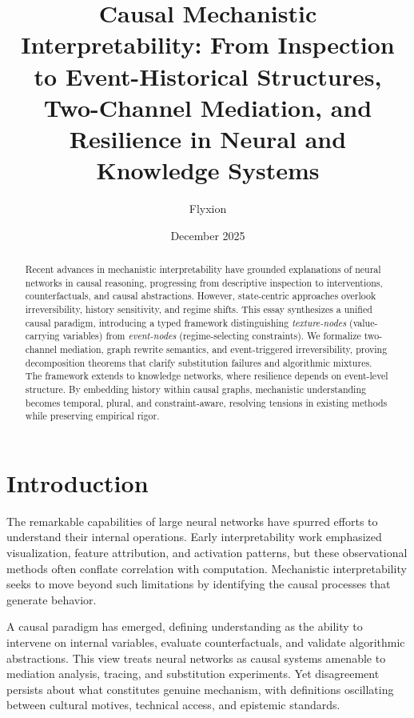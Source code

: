 \documentclass[11pt]{article}
\title{Causal Mechanistic Interpretability: From Inspection to Event-Historical Structures, Two-Channel Mediation, and Resilience in Neural and Knowledge Systems}
\author{Flyxion}
\date{December 2025}
\theoremstyle{remark}
\begin{document}
\maketitle

\begin{abstract}

Recent advances in mechanistic interpretability have grounded explanations of neural networks in causal reasoning, progressing from descriptive inspection to interventions, counterfactuals, and causal abstractions. However, state-centric approaches overlook irreversibility, history sensitivity, and regime shifts. This essay synthesizes a unified causal paradigm, introducing a typed framework distinguishing \emph{texture-nodes} (value-carrying variables) from \emph{event-nodes} (regime-selecting constraints). We formalize two-channel mediation, graph rewrite semantics, and event-triggered irreversibility, proving decomposition theorems that clarify substitution failures and algorithmic mixtures. The framework extends to knowledge networks, where resilience depends on event-level structure. By embedding history within causal graphs, mechanistic understanding becomes temporal, plural, and constraint-aware, resolving tensions in existing methods while preserving empirical rigor.

\end{abstract}

\tableofcontents

\section{Introduction}

The remarkable capabilities of large neural networks have spurred efforts to understand their internal operations. Early interpretability work emphasized visualization, feature attribution, and activation patterns, but these observational methods often conflate correlation with computation. Mechanistic interpretability seeks to move beyond such limitations by identifying the causal processes that generate behavior.

A causal paradigm has emerged, defining understanding as the ability to intervene on internal variables, evaluate counterfactuals, and validate algorithmic abstractions. This view treats neural networks as causal systems amenable to mediation analysis, tracing, and substitution experiments. Yet disagreement persists about what constitutes genuine mechanism, with definitions oscillating between cultural motives, technical access, and epistemic standards.
\end{document}

